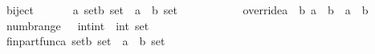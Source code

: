 \begin{isabellebody}
biject\ \ \ \ \ \ \ {\isacharcolon}{\isacharcolon}{\isachardoublequoteopen}{\isacharbrackleft}{\isacharprime}a\ set{\isacharcomma}{\isacharprime}b\ set{\isacharbrackright}\ {\isacharequal}{\isachargreater}\ {\isacharparenleft}{\isacharprime}a\ {\isacharless}{\isacharequal}{\isachargreater}\ {\isacharprime}b{\isacharparenright}\ set{\isachardoublequoteclose}\ \ \ \ \ {\isacharparenleft}{\isachardoublequoteopen}{\isacharunderscore}\ {\isasymbij}\ {\isacharunderscore}{\isachardoublequoteclose}\ \ \ {\isacharbrackleft}{}{}{\isacharcomma}{}{}{\isacharbrackright}\ {}{}{\isacharparenright}\isanewline
override{\isacharcolon}{\isacharcolon}{\isachardoublequoteopen}{\isacharbrackleft}{\isacharprime}a\ {\isacharless}{\isacharequal}{\isachargreater}\ {\isacharprime}b{\isacharcomma}\ {\isacharprime}a\ {\isacharless}{\isacharequal}{\isachargreater}\ {\isacharprime}b{\isacharbrackright}\ {\isacharequal}{\isachargreater}\ {\isacharparenleft}{\isacharprime}a\ {\isacharless}{\isacharequal}{\isachargreater}\ {\isacharprime}b{\isacharparenright}{\isachardoublequoteclose}\ \ {\isacharparenleft}{\isachardoublequoteopen}{\isacharunderscore}\ {\isasymoplus}\ {\isacharunderscore}{\isachardoublequoteclose}\ {\isacharbrackleft}{}{}{\isacharcomma}{}{}{\isacharbrackright}\ {}{}{\isacharparenright}\isanewline
numb{\isacharunderscore}range\ \ \ {\isacharcolon}{\isacharcolon}{\isachardoublequoteopen}{\isacharbrackleft}int{\isacharcomma}int{\isacharbrackright}\ {\isacharequal}{\isachargreater}\ {\isacharparenleft}int{\isacharparenright}\ set{\isachardoublequoteclose}\ \ \ \ \ \ \ \ \ \ \ \ \ \ \ \ \ {\isacharparenleft}{\isachardoublequoteopen}{\isacharunderscore}\ {\isasymupto}\ {\isacharunderscore}{\isachardoublequoteclose}\ \ {\isacharbrackleft}{}{}{\isacharcomma}{}{}{\isacharbrackright}\ {}{}{\isacharparenright}\isanewline
fin{\isacharunderscore}part{\isacharunderscore}func{\isacharcolon}{\isacharcolon}{\isachardoublequoteopen}{\isacharbrackleft}{\isacharprime}a\ set{\isacharcomma}{\isacharprime}b\ set{\isacharbrackright}\ {\isacharequal}{\isachargreater}\ {\isacharparenleft}{\isacharprime}a\ {\isacharless}{\isacharequal}{\isachargreater}\ {\isacharprime}b{\isacharparenright}\ set{\isachardoublequoteclose}\ \ \ \ \ {\isacharparenleft}{\isachardoublequoteopen}{\isacharunderscore}\ {\isasymffun}\ {\isacharunderscore}{\isachardoublequoteclose}\ \ {\isacharbrackleft}{}{}{\isacharcomma}{}{}{\isacharbrackright}\ {}{}{\isacharparenright}\isanewline

\end{isabellebody}

